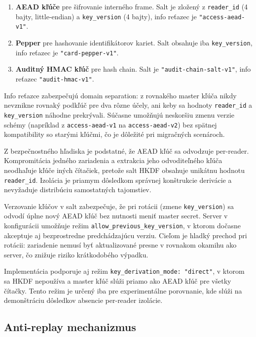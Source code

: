 \documentclass[journal,a4paper,onecolumn]{IEEEtran}
\begin{document}
\begin{enumerate}[leftmargin=*,itemsep=2pt]
  \item \textbf{AEAD kľúče} pre šifrovanie interného frame. Salt je zložený z \texttt{reader\_id} (4 bajty, little-endian) a \texttt{key\_version} (4 bajty), info reťazec je \texttt{"access-aead-v1"}.
  \item \textbf{Pepper} pre hashovanie identifikátorov kariet. Salt obsahuje iba \texttt{key\_version}, info reťazec je \texttt{"card-pepper-v1"}.
  \item \textbf{Auditný HMAC kľúč} pre hash chain. Salt je \texttt{"audit-chain-salt-v1"}, info reťazec \texttt{"audit-hmac-v1"}.
\end{enumerate}

Info reťazce zabezpečujú domain separation: z rovnakého master kľúča nikdy nevznikne rovnaký podkľúč pre dva rôzne účely, ani keby sa hodnoty \texttt{reader\_id} a \texttt{key\_version} náhodne prekrývali. Súčasne umožňujú neskoršiu zmenu verzie schémy (napríklad z \texttt{access-aead-v1} na \texttt{access-aead-v2}) bez spätnej kompatibility so starými kľúčmi, čo je dôležité pri migračných scenároch.

Z bezpečnostného hľadiska je podstatné, že AEAD kľúč sa odvodzuje per-reader. Kompromitácia jedného zariadenia a extrakcia jeho odvoditeľného kľúča neodhaľuje kľúče iných čítačiek, pretože salt HKDF obsahuje unikátnu hodnotu \texttt{reader\_id}. Izolácia je priamym dôsledkom správnej konštrukcie derivácie a nevyžaduje distribúciu samostatných tajomstiev.

Verzovanie kľúčov v salt zabezpečuje, že pri rotácii (zmene \texttt{key\_version}) sa odvodí úplne nový AEAD kľúč bez nutnosti meniť master secret. Server v konfigurácii umožňuje režim \texttt{allow\_previous\_key\_version}, v ktorom dočasne akceptuje aj bezprostredne predchádzajúcu verziu. Cieľom je hladký prechod pri rotácii: zariadenie nemusí byť aktualizované presne v rovnakom okamihu ako server, čo znižuje riziko krátkodobého výpadku\cite{NIST80057}.

Implementácia podporuje aj režim \texttt{key\_derivation\_mode: "direct"}, v ktorom sa HKDF nepoužíva a master kľúč slúži priamo ako AEAD kľúč pre všetky čítačky. Tento režim je určený iba pre experimentálne porovnanie, kde slúži na demonštráciu dôsledkov absencie per-reader izolácie.

\subsection{Anti-replay mechanizmus}
\end{document}

